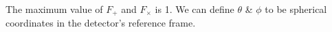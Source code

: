 \documentclass{ttuthes2007}
\begin{document}
The maximum value of $F_+$ and $F_\times$ is 1. We can define $\theta$ \&
$\phi$ to be spherical coordinates in the detector's reference frame. 
%
%
\end{document}
